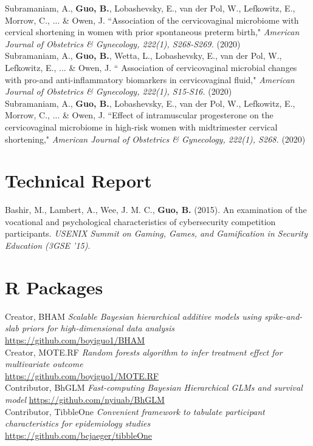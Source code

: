 Subramaniam, A., \textbf{Guo, B.}, Lobashevsky, E., van der Pol, W., Lefkowitz, E., Morrow, C., ... \& Owen, J.  ``Association of the cervicovaginal microbiome with cervical shortening in women with prior spontaneous preterm birth," \textit{American Journal of Obstetrics \& Gynecology, 222(1), S268-S269.} (2020)\\

Subramaniam, A., \textbf{Guo, B.}, Wetta, L., Lobashevsky, E., van der Pol, W., Lefkowitz, E., ... \& Owen, J. `` Association of cervicovaginal microbial changes with pro-and anti-inflammatory biomarkers in cervicovaginal fluid," \textit{American Journal of Obstetrics \& Gynecology, 222(1), S15-S16.} (2020)\\

Subramaniam, A., \textbf{Guo, B.}, Lobashevsky, E., van der Pol, W., Lefkowitz, E., Morrow, C., ... \& Owen, J. ``Effect of intramuscular progesterone on the cervicovaginal microbiome in high-risk women with midtrimester cervical shortening," \textit{American Journal of Obstetrics \& Gynecology, 222(1), S268.} (2020)\\

\section{Technical Report}
Bashir, M., Lambert, A., Wee, J. M. C., \textbf{Guo, B.} (2015). An examination of the vocational and psychological characteristics of cybersecurity competition participants. \textit{USENIX Summit on Gaming, Games, and Gamification in Security Education (3GSE '15)}.


\section{R Packages}
\vspace{-3ex}

    Creator, BHAM {\it Scalable Bayesian hierarchical additive models using spike-and-slab  priors for high-dimensional data analysis}\\
    \url{https://github.com/boyiguo1/BHAM}\\
    
	Creator, MOTE.RF {\it Random forests algorithm to infer treatment effect for multivariate outcome}\\
	\url{https://github.com/boyiguo1/MOTE.RF}\\
	
	Contributor, BhGLM {\it Fast-computing Bayesian Hierarchical GLMs and survival model}
	\url{https://github.com/nyiuab/BhGLM}\\
	
	Contributor, TibbleOne {\it Convenient framework to tabulate participant characteristics for epidemiology studies}\\
	\url{https://github.com/bcjaeger/tibbleOne}\\
